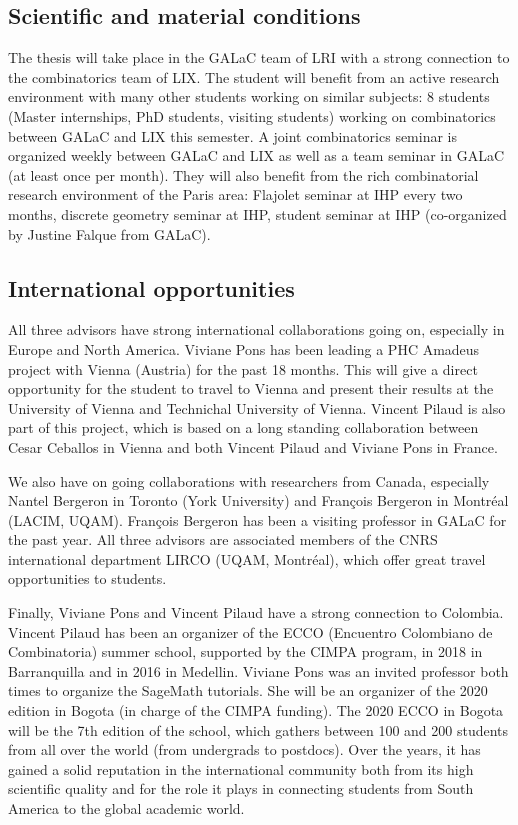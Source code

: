 \documentclass[a4paper,12pt]{article}
\begin{document}
\subsection{Scientific and material conditions}

The thesis will take place in the GALaC team of LRI with a strong connection to the combinatorics team of LIX. The student will benefit from an active research environment with many other students working on similar subjects: 8 students (Master internships, PhD students, visiting students) working on combinatorics between GALaC and LIX this semester. A joint combinatorics seminar is organized weekly between GALaC and LIX as well as a team seminar in GALaC (at least once per month). They will also benefit from the rich combinatorial research environment of the Paris area: Flajolet seminar at IHP every two months, discrete geometry seminar at IHP, student seminar at IHP (co-organized by Justine Falque from GALaC). 

\subsection{International opportunities}

All three advisors have strong international collaborations going on, especially in Europe and North America. Viviane Pons has been leading a PHC Amadeus project with Vienna (Austria) for the past 18 months. This will give a direct opportunity for the student to travel to Vienna and present their results at the University of Vienna and Technichal University of Vienna. Vincent Pilaud is also part of this project, which is based on a long standing collaboration between Cesar Ceballos in Vienna and both Vincent Pilaud and Viviane Pons in France. 

We also have on going collaborations with researchers from Canada, especially Nantel Bergeron in Toronto (York University) and François Bergeron in Montréal (LACIM, UQAM). François Bergeron has been a visiting professor in GALaC for the past year. All three advisors are associated members of the CNRS international department LIRCO (UQAM, Montréal), which offer great travel opportunities to students. 

Finally, Viviane Pons and Vincent Pilaud have a strong connection to Colombia. Vincent Pilaud has been an organizer of the ECCO (Encuentro Colombiano de Combinatoria) summer school, supported by the CIMPA program, in 2018 in Barranquilla and in 2016 in Medellin. Viviane Pons was an invited professor both times to organize the SageMath tutorials. She will be an organizer of the 2020 edition in Bogota (in charge of the CIMPA funding). The 2020 ECCO in Bogota will be the 7th edition of the school, which gathers between 100 and 200 students from all over the world (from undergrads to postdocs). Over the years, it has gained a solid reputation in the international community both from its high scientific quality and for the role it plays in connecting students from South America to the global academic world. 
\end{document}
